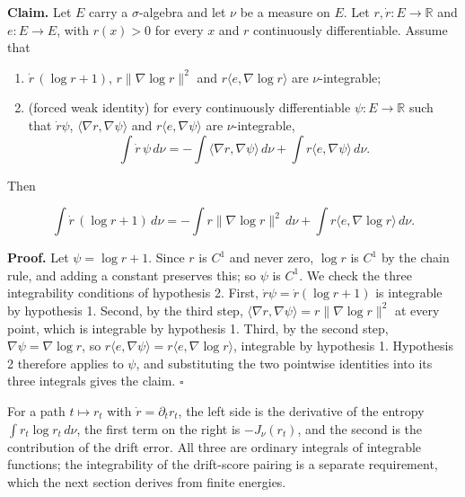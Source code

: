 \documentclass[11pt,a4paper]{article}
\begin{document}
\textbf{Claim.} Let \(E\) carry a \(\sigma\)-algebra and let \(\nu\) be a measure on \(E\). Let \(r,\dot r:E\to\mathbb R\) and \(e:E\to E\), with \(r(x)>0\) for every \(x\) and \(r\) continuously differentiable. Assume that



\begin{enumerate}


\item \(\dot r\,(\log r+1)\), \(r\|\nabla\log r\|^2\) and \(r\langle e,\nabla\log r\rangle\) are \(\nu\)-integrable;

\item (forced weak identity) for every continuously differentiable \(\psi:E\to\mathbb R\) such that \(\dot r\psi\), \(\langle\nabla r,\nabla\psi\rangle\) and \(r\langle e,\nabla\psi\rangle\) are \(\nu\)-integrable,
\[\int\dot r\,\psi\,d\nu=-\int\langle\nabla r,\nabla\psi\rangle\,d\nu+\int r\langle e,\nabla\psi\rangle\,d\nu.\]

\end{enumerate}



Then


\[\int\dot r\,(\log r+1)\,d\nu=-\int r\|\nabla\log r\|^2\,d\nu+\int r\langle e,\nabla\log r\rangle\,d\nu.\]


\textbf{Proof.} Let \(\psi=\log r+1\). Since \(r\) is \(C^1\) and never zero, \(\log r\) is \(C^1\) by the chain rule, and adding a constant preserves this; so \(\psi\) is \(C^1\). We check the three integrability conditions of hypothesis 2. First, \(\dot r\psi=\dot r(\log r+1)\) is integrable by hypothesis 1. Second, by the third step, \(\langle\nabla r,\nabla\psi\rangle=r\|\nabla\log r\|^2\) at every point, which is integrable by hypothesis 1. Third, by the second step, \(\nabla\psi=\nabla\log r\), so \(r\langle e,\nabla\psi\rangle=r\langle e,\nabla\log r\rangle\), integrable by hypothesis 1. Hypothesis 2 therefore applies to \(\psi\), and substituting the two pointwise identities into its three integrals gives the claim. \(\square\)




For a path \(t\mapsto r_t\) with \(\dot r=\partial_tr_t\), the left side is the derivative of the entropy \(\int r_t\log r_t\,d\nu\), the first term on the right is \(-J_\nu(r_t)\), and the second is the contribution of the drift error. All three are ordinary integrals of integrable functions; the integrability of the drift-score pairing is a separate requirement, which the next section derives from finite energies.
\end{document}
